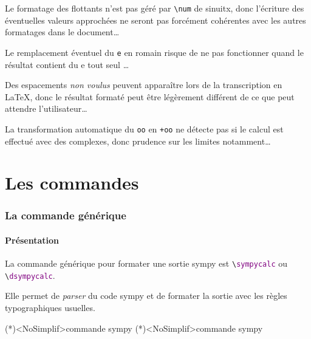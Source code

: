 \documentclass[french,a4paper,11pt]{article}
\begin{document}
\begin{warningblock}
Le formatage des flottants n'est pas géré par \texttt{\textbackslash num} de \textsf{sinuitx}, donc l'écriture des éventuelles valeurs approchées ne seront pas forcément cohérentes avec les autres formatages dans le document\ldots

\smallskip

Le remplacement éventuel du \texttt{e} en \textsf{romain} risque de ne pas fonctionner quand le résultat contient du \og e tout seul \fg\ldots

\smallskip

Des espacements \textit{non voulus} peuvent apparaître lors de la transcription en \LaTeX, donc le résultat formaté peut être légèrement différent de ce que peut attendre l'utilisateur\ldots

\smallskip

La transformation automatique du \texttt{oo} en \texttt{+oo} ne détecte pas si le calcul est effectué avec des complexes, donc prudence sur les limites notamment\ldots
\end{warningblock}

\newpage

\part{Les commandes}

\section{La commande générique}

\subsection{Présentation}

\begin{cautionblock}
La commande générique pour formater une sortie \textsf{sympy} est \texttt{\textbackslash \textcolor{purple}{sympycalc}} ou \texttt{\textbackslash \textcolor{purple}{dsympycalc}}.

\smallskip

Elle permet de \textit{parser} du code \textsf{sympy} et de formater la sortie avec les règles typographiques usuelles.
\end{cautionblock}

\begin{bloctext}
\sympycalc(*)<NoSimplif>{commande sympy}
\dsympycalc(*)<NoSimplif>{commande sympy}
\end{bloctext}
\end{document}
